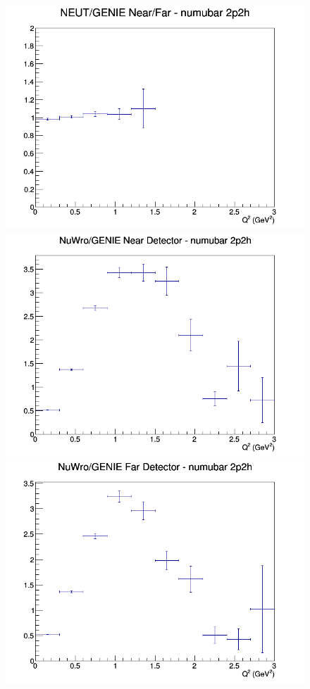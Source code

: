 \begin{figure}[h]
\endminipage
{}
\includegraphics[width=\linewidth]{Q2/nominal/ratios/2p2h_NEUT_GENIE_numubar_NF_Q2.png}
\endminipage
\newline
{}
\includegraphics[width=\linewidth]{Q2/nominal/ratios/2p2h_NuWro_GENIE_numubar_near_Q2.png}
\endminipage
{}
\includegraphics[width=\linewidth]{Q2/nominal/ratios/2p2h_NuWro_GENIE_numubar_far_Q2.png}

\end{figure}
